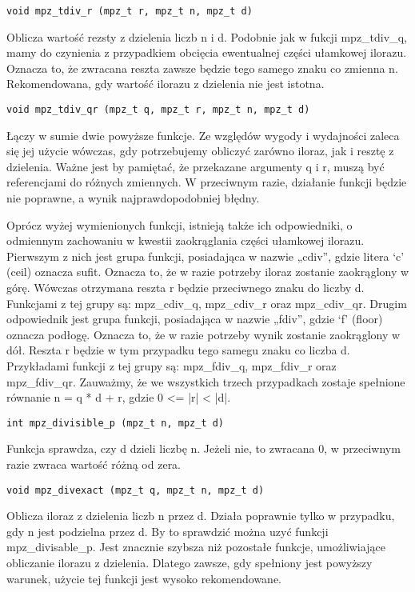 \documentclass[twoside,a4paper]{book}
\begin{document}
\begin{lstlisting}
void mpz_tdiv_r (mpz_t r, mpz_t n, mpz_t d)
\end{lstlisting}
Oblicza wartość rezsty z dzielenia liczb n i d. Podobnie jak w fukcji mpz\_tdiv\_q, mamy do czynienia z przypadkiem obcięcia ewentualnej części ułamkowej ilorazu. Oznacza to, że zwracana reszta zawsze będzie tego samego znaku co zmienna n. Rekomendowana, gdy wartość ilorazu z dzielenia nie jest istotna.

\begin{lstlisting}
void mpz_tdiv_qr (mpz_t q, mpz_t r, mpz_t n, mpz_t d)
\end{lstlisting}

Łączy w sumie dwie powyższe funkcje. Ze względów wygody i wydajności zaleca się jej użycie wówczas, gdy potrzebujemy obliczyć zarówno iloraz, jak i resztę z dzielenia. Ważne jest by pamiętać, że przekazane argumenty q i r, muszą być referencjami do różnych zmiennych. W przeciwnym razie, działanie funkcji będzie nie poprawne, a wynik najprawdopodobniej błędny.

Oprócz wyżej wymienionych funkcji, istnieją także ich odpowiedniki, o odmiennym zachowaniu w kwestii zaokrąglania części ułamkowej ilorazu. Pierwszym z nich jest grupa funkcji, posiadająca w nazwie „cdiv”, gdzie litera ‘c’ (ceil) oznacza sufit. Oznacza to, że w razie potrzeby iloraz zostanie zaokrąglony w górę. Wówczas otrzymana reszta r będzie przeciwnego znaku do liczby d. Funkcjami z tej grupy są: mpz\_cdiv\_q, mpz\_cdiv\_r oraz mpz\_cdiv\_qr. Drugim odpowiednik jest grupa funkcji, posiadająca w nazwie „fdiv”, gdzie ‘f’ (floor) oznacza podłogę. Oznacza to, że w razie potrzeby wynik zostanie zaokrąglony w dół. Reszta r będzie w tym przypadku tego samegu znaku co liczba d. Przykładami funkcji z tej grupy są:  mpz\_fdiv\_q, mpz\_fdiv\_r oraz mpz\_fdiv\_qr. Zauważmy, że we wszystkich trzech przypadkach zostaje spełnione równanie n = q * d + r, gdzie 0 <= |r| < |d|.

\begin{lstlisting}
int mpz_divisible_p (mpz_t n, mpz_t d)
\end{lstlisting}
Funkcja sprawdza, czy d dzieli liczbę n. Jeżeli nie, to zwracana 0, w przeciwnym razie zwraca wartość różną od zera.

\begin{lstlisting}
void mpz_divexact (mpz_t q, mpz_t n, mpz_t d)
\end{lstlisting}
Oblicza iloraz z dzielenia liczb n przez d. Działa poprawnie tylko w przypadku, gdy n jest podzielna przez d. By to sprawdzić można uzyć funkcji mpz\_divisable\_p. Jest znacznie szybsza niż pozostałe funkcje, umożliwiające obliczanie ilorazu z dzielenia. Dlatego zawsze, gdy spełniony jest powyższy warunek,  użycie tej funkcji jest wysoko rekomendowane.
\end{document}
